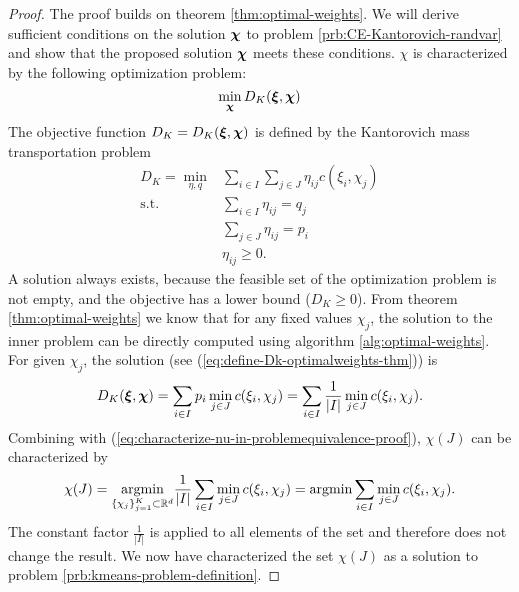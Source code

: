 \begin{proof}
  The proof builds on theorem \ref{thm:optimal-weights}.
  We will derive sufficient conditions on the solution $\boldsymbol\chi$ to problem \ref{prb:CE-Kantorovich-randvar} and show that the proposed solution $\boldsymbol\chi$ meets these conditions.
  $\chi$ is characterized by the following optimization problem:
  \begin{equation}
    \label{eq:characterize-nu-in-problemequivalence-proof}
    \min\limits_{\boldsymbol\chi}D_K(\boldsymbol\xi,\boldsymbol\chi)
  \end{equation}
  The objective function $D_K = D_K(\boldsymbol\xi,\boldsymbol\chi)$ is defined by the Kantorovich mass transportation problem
  \begin{align}
    \label{eq:kantoro-in-problemequivalence-proof}
    D_K = \min\limits_{\eta, q}& \sum_{i\in I}\sum_{j\in J}\eta_{ij}c(\xi_i,\chi_j)\\
    \text{s.t.}&\sum_{i\in I}\eta_{ij} = q_j\\
    &\sum_{j\in J}\eta_{ij} = p_i\\
    &\eta_{ij}\geq 0.
  \end{align}
  A solution always exists, because the feasible set of the optimization problem is not empty, and the objective has a lower bound ($D_K\geq 0$).
  From theorem \ref{thm:optimal-weights} we know that for any fixed values $\chi_j$, the solution to the inner problem can be directly computed using algorithm \ref{alg:optimal-weights}.
  For given $\chi_j$, the solution (see (\ref{eq:define-Dk-optimalweights-thm})) is
  \begin{equation}
    \label{eq:repeat-Dk-optimalweights-for-kmeansproof}
    D_K(\boldsymbol\xi,\boldsymbol\chi) = \sum_{i\in I}p_i\min\limits_{j\in J}c(\xi_i,\chi_j) = \sum_{i\in I}\frac{1}{|I|}\min\limits_{j\in J}c(\xi_i,\chi_j).
  \end{equation}
  Combining with (\ref{eq:characterize-nu-in-problemequivalence-proof}), $\chi(J)$ can be characterized by
  \begin{equation}
    \label{eq:end-of-kmeans-proof}
    \chi(J) = \underset{\{\chi_j\}_{j=1}^K\subset\mathbb{R}^d}{\operatorname{argmin}} \frac{1}{|I|}\sum_{i\in I}\min\limits_{j\in J} c(\xi_i,\chi_j) = \operatorname{argmin} \sum_{i\in I}\min\limits_{j\in J} c(\xi_i,\chi_j).
  \end{equation}
  The constant factor $\frac{1}{|I|}$ is applied to all elements of the set and therefore does not change the result.
  We now have characterized the set $\chi(J)$ as a solution to problem \ref{prb:kmeans-problem-definition}.
\end{proof}
